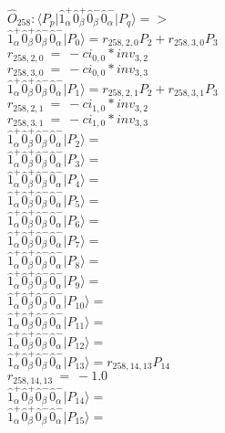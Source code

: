 \documentclass[14pt]{article}
\begin{document}
    $\hat{O}_{258}:  \langle{P_p}\vert \hat{1}_{\alpha}^{+}\hat{0}_{\beta}^{+}\hat{0}_{\beta}^{-}\hat{0}_{\alpha}^{-} \vert{P_q}\rangle => $ \\ 
    $ \hat{1}_{\alpha}^{+}\hat{0}_{\beta}^{+}\hat{0}_{\beta}^{-}\hat{0}_{\alpha}^{-} \vert{P_{0}}\rangle = {r}_{258,2,0}P_{2}+{r}_{258,3,0}P_{3} $ \\ 
    ${r}_{258,2,0}\ =\ -{ci}_{0,0}*{inv}_{3,2} $ \\ 
    ${r}_{258,3,0}\ =\ -{ci}_{0,0}*{inv}_{3,3} $ \\ 
    $ \hat{1}_{\alpha}^{+}\hat{0}_{\beta}^{+}\hat{0}_{\beta}^{-}\hat{0}_{\alpha}^{-} \vert{P_{1}}\rangle = {r}_{258,2,1}P_{2}+{r}_{258,3,1}P_{3} $ \\ 
    ${r}_{258,2,1}\ =\ -{ci}_{1,0}*{inv}_{3,2} $ \\ 
    ${r}_{258,3,1}\ =\ -{ci}_{1,0}*{inv}_{3,3} $ \\ 
    $ \hat{1}_{\alpha}^{+}\hat{0}_{\beta}^{+}\hat{0}_{\beta}^{-}\hat{0}_{\alpha}^{-} \vert{P_{2}}\rangle =  $ \\ 
    $ \hat{1}_{\alpha}^{+}\hat{0}_{\beta}^{+}\hat{0}_{\beta}^{-}\hat{0}_{\alpha}^{-} \vert{P_{3}}\rangle =  $ \\ 
    $ \hat{1}_{\alpha}^{+}\hat{0}_{\beta}^{+}\hat{0}_{\beta}^{-}\hat{0}_{\alpha}^{-} \vert{P_{4}}\rangle =  $ \\ 
    $ \hat{1}_{\alpha}^{+}\hat{0}_{\beta}^{+}\hat{0}_{\beta}^{-}\hat{0}_{\alpha}^{-} \vert{P_{5}}\rangle =  $ \\ 
    $ \hat{1}_{\alpha}^{+}\hat{0}_{\beta}^{+}\hat{0}_{\beta}^{-}\hat{0}_{\alpha}^{-} \vert{P_{6}}\rangle =  $ \\ 
    $ \hat{1}_{\alpha}^{+}\hat{0}_{\beta}^{+}\hat{0}_{\beta}^{-}\hat{0}_{\alpha}^{-} \vert{P_{7}}\rangle =  $ \\ 
    $ \hat{1}_{\alpha}^{+}\hat{0}_{\beta}^{+}\hat{0}_{\beta}^{-}\hat{0}_{\alpha}^{-} \vert{P_{8}}\rangle =  $ \\ 
    $ \hat{1}_{\alpha}^{+}\hat{0}_{\beta}^{+}\hat{0}_{\beta}^{-}\hat{0}_{\alpha}^{-} \vert{P_{9}}\rangle =  $ \\ 
    $ \hat{1}_{\alpha}^{+}\hat{0}_{\beta}^{+}\hat{0}_{\beta}^{-}\hat{0}_{\alpha}^{-} \vert{P_{10}}\rangle =  $ \\ 
    $ \hat{1}_{\alpha}^{+}\hat{0}_{\beta}^{+}\hat{0}_{\beta}^{-}\hat{0}_{\alpha}^{-} \vert{P_{11}}\rangle =  $ \\ 
    $ \hat{1}_{\alpha}^{+}\hat{0}_{\beta}^{+}\hat{0}_{\beta}^{-}\hat{0}_{\alpha}^{-} \vert{P_{12}}\rangle =  $ \\ 
    $ \hat{1}_{\alpha}^{+}\hat{0}_{\beta}^{+}\hat{0}_{\beta}^{-}\hat{0}_{\alpha}^{-} \vert{P_{13}}\rangle = {r}_{258,14,13}P_{14} $ \\ 
    ${r}_{258,14,13}\ =\ -1.0 $ \\ 
    $ \hat{1}_{\alpha}^{+}\hat{0}_{\beta}^{+}\hat{0}_{\beta}^{-}\hat{0}_{\alpha}^{-} \vert{P_{14}}\rangle =  $ \\ 
    $ \hat{1}_{\alpha}^{+}\hat{0}_{\beta}^{+}\hat{0}_{\beta}^{-}\hat{0}_{\alpha}^{-} \vert{P_{15}}\rangle =  $ \\ 
    
\end{document}

